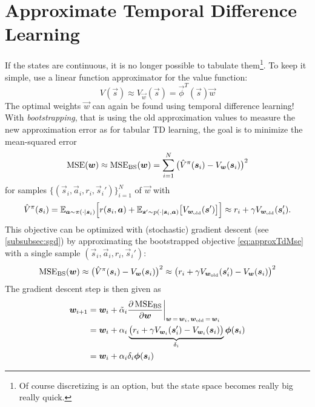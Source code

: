 	\section{Approximate Temporal Difference Learning}
		If the states are continuous, it is no longer possible to tabulate them\footnote{Of course discretizing is an option, but the state space becomes really big really quick.}. To keep it simple, use a linear function approximator for the value function:
		\begin{equation*}
			V(\vec{s}) \approx V_{\vec{w}}(\vec{s}) = \vec{\phi}^T(\vec{s}) \vec{w}
		\end{equation*}
		The optimal weights \(\vec{w}\) can again be found using temporal difference learning! With \emph{bootstrapping}, that is using the old approximation values to measure the new approximation error as for tabular TD learning, the goal is to minimize the mean-squared error
		\begin{equation*}
			\operatorname{MSE}(\bm{w}) \approx \operatorname{MSE}_\mathrm{BS}(\bm{w}) = \sum_{i = 1}^{N} \big( \hat{V}^\pi(\bm{s}_i) - V_{\bm{w}}(\bm{s}_i) \big)^2  \label{eq:approxTdMse}
		\end{equation*}
		for samples \( \big\{ (\vec{s}_i, \vec{a}_i, r_i, \vec{s}_i') \big\}_{i = 1}^{N} \) of \(\vec{w}\) with
		\begin{equation*}
			\hat{V}^\pi(\bm{s}_i) = \mathbb{E}_{\bm{a} \sim \pi(\cdot \vert \bm{s}_i)} \Big[ r(\bm{s}_i, \bm{a}) + \mathbb{E}_{\bm{s}' \sim p(\cdot \vert \bm{s}_i, \bm{a})}\big[ V_{\bm{w}_\mathrm{old}}(\bm{s}') \big] \Big] \approx r_i + \gamma V_{\bm{w}_\mathrm{old}}(\bm{s}_i').
		\end{equation*}
		This objective can be optimized with (stochastic) gradient descent (see \autoref{subsubsec:sgd}) by approximating the bootstrapped objective \eqref{eq:approxTdMse} with a single sample \( (\vec{s}_i, \vec{a}_i, r_i, \vec{s}_i') \):
		\begin{equation}
			\operatorname{MSE}_\mathrm{BS}(\bm{w})
			\approx \big( \hat{V}^\pi(\bm{s}_i) - V_{\bm{w}}(\bm{s}_i) \big)^2
			\approx \big( r_i + \gamma V_{\bm{w}_\mathrm{old}}(\bm{s}_i') - V_{\bm{w}}(\bm{s}_i) \big)^2  \label{eq:approxValueError}
		\end{equation}
		The gradient descent step is then given as
		\begin{align*}
			\bm{w}_{i + 1}
			 & = \bm{w}_i + \tilde{\alpha}_i \pdv{\operatorname{MSE}_\mathrm{BS}}{\bm{w}} \bigg\vert_{\bm{w} \,=\, \bm{w}_i,\, \bm{w}_\mathrm{old} \,=\, \bm{w}_i}        \\
			 & = \bm{w}_i + \alpha_i \underbrace{\big( r_i + \gamma V_{\bm{w}_i}(\bm{s}_i') - V_{\bm{w}_i}(\bm{s}_i) \big)}_{\delta_i} \bm{\phi}(\bm{s}_i) \\
			 & = \bm{w}_i + \alpha_i \delta_i \bm{\phi}(\bm{s}_i)
		\end{align*}
